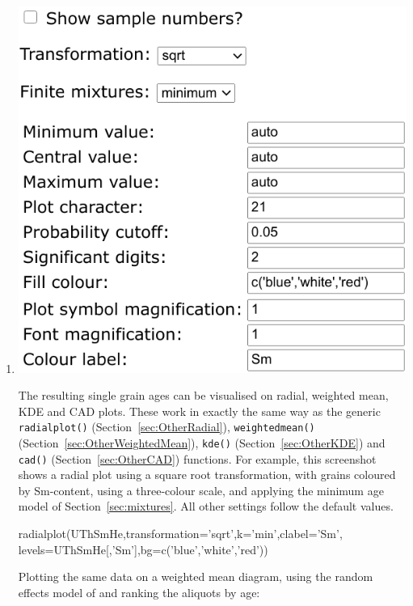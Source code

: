 \begin{refsection}
\begin{enumerate}
\item\noindent\begin{minipage}[t]{.5\linewidth}
\strut\vspace*{-\baselineskip}\newline
\includegraphics[width=\linewidth]{../figures/UThHeRadial.png}
\end{minipage}
\begin{minipage}[t]{.5\linewidth}
The resulting single grain ages can be visualised on radial, weighted
mean, KDE and CAD plots. These work in exactly the same way as the
generic \texttt{radialplot()} (Section~\ref{sec:OtherRadial}),
\texttt{weightedmean()} (Section~\ref{sec:OtherWeightedMean}),
\texttt{kde()} (Section~\ref{sec:OtherKDE}) and \texttt{cad()}
(Section~\ref{sec:OtherCAD}) functions. For example, this screenshot
shows a radial plot using a square root transformation, with grains
coloured by Sm-content, using a three-colour scale, and applying the
minimum age model of Section~\ref{sec:mixtures}. All other settings
follow the default values.
\end{minipage}
  
\begin{script}
radialplot(UThSmHe,transformation='sqrt',k='min',clabel='Sm',
           levels=UThSmHe[,'Sm'],bg=c('blue','white','red'))
\end{script}

Plotting the same data on a weighted mean diagram, using the random
effects model of and ranking the aliquots by age:


\end{enumerate}
\end{refsection}
